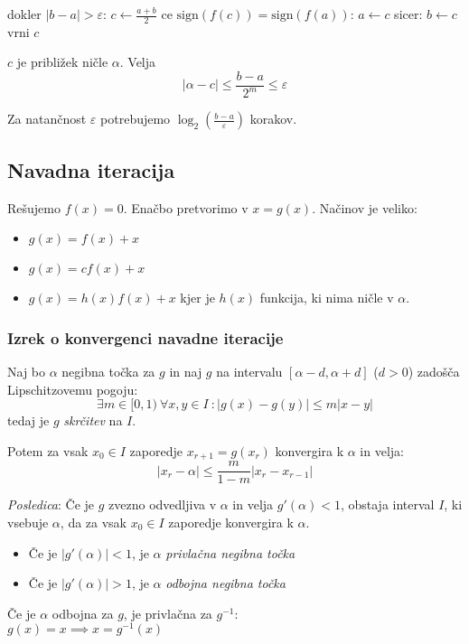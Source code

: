 \begin{multicols}{4}
\begin{koda}[]
dokler $|b-a| > \varepsilon$:
	$c \leftarrow \frac{a+b}{2}$
	ce $\text{sign}(f(c)) = \text{sign}(f(a))$:
		$a \leftarrow c$
	sicer:
		$b \leftarrow c$
vrni $c$
\end{koda}

$c$ je približek ničle $\alpha$. Velja
\[ |\alpha - c| \leq \frac{b-a}{2^m} \leq \varepsilon\]

Za natančnost $\varepsilon$ potrebujemo  $\log_2 \left( \frac{b-a}{\varepsilon}\right)$ korakov.


\subsection{Navadna iteracija}
Rešujemo $f(x) = 0$. Enačbo pretvorimo v $x = g(x)$. Načinov je veliko:
\begin{itemize}
	\item $g(x) = f(x) + x$
	\item $g(x) = cf(x) + x$
	\item $g(x) = h(x)f(x) + x$ kjer je $h(x)$ funkcija, ki nima ničle v $\alpha$.
\end{itemize}

\subsubsection{Izrek o konvergenci navadne iteracije}
Naj bo $\alpha$ negibna točka za $g$ in naj $g$ na intervalu $[\alpha - d, \alpha + d]$ ($d > 0$)
zadošča Lipschitzovemu pogoju:
\[ \exists m \in [0, 1)\ \forall x,y \in I\ : |g(x) - g(y)| \leq m |x-y| \]
tedaj je $g$ \textit{skrčitev} na $I$.

Potem za vsak $x_0 \in I$ zaporedje $x_{r+1} = g(x_r)$ konvergira k $\alpha$ in velja:
\[ |x_r - \alpha| \leq \frac{m}{1-m} |x_r - x_{r-1}| \]

\textit{Posledica}: Če je $g$ zvezno odvedljiva v $\alpha$ in velja $g'(\alpha) < 1$, obstaja interval $I$, ki vsebuje $\alpha$, da za vsak $x_0 \in I$ zaporedje konvergira k $\alpha$.

\begin{itemize}
	\item Če je $|g'(\alpha)| < 1$, je $\alpha$ \textit{privlačna negibna točka}
	\item Če je $|g'(\alpha)| > 1$, je $\alpha$ \textit{odbojna negibna točka}
\end{itemize}

Če je $\alpha$ odbojna za $g$, je privlačna za $g^{-1}$:\\ $g(x) = x \implies x = g^{-1}(x)$


\end{multicols}

